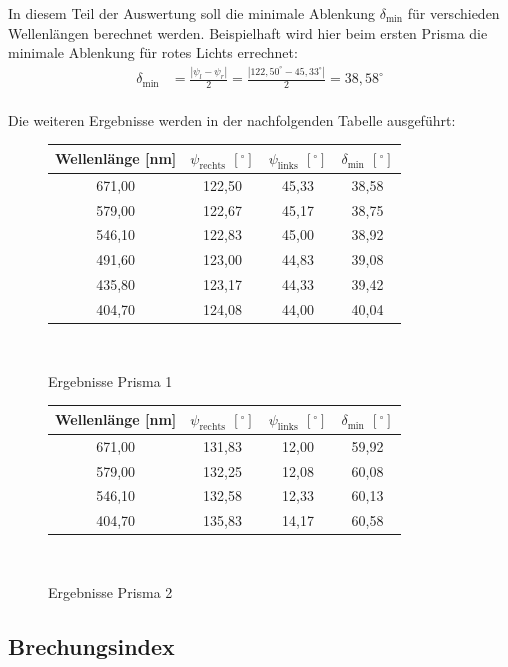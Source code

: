 \documentclass[fontsize=12pt]{scrartcl}
\renewcommand{\l}{\left\vert}
\renewcommand{\r}{\right\vert}
\begin{document}
In diesem Teil der Auswertung soll die minimale Ablenkung $\delta_{\text{min}}$ für verschieden Wellenlängen berechnet werden. Beispielhaft wird hier beim ersten Prisma die minimale Ablenkung für rotes Lichts errechnet:
\begin{align*}
\delta_{\text{min}} &=\frac{\l \psi_l - \psi_r  \r}{2} = \frac{\l 122,50^{\circ} - 45,33^{\circ}  \r}{2} = 38,58^{\circ}
\end{align*}\\
Die weiteren Ergebnisse werden in der nachfolgenden Tabelle ausgeführt:
\begin{figure}[h]
\centering
\caption{Ergebnisse Prisma 1}
\begin{tabular}{|c|c|c|c|} \hline
Wellenlänge [nm] & $\psi_{\text{rechts}}$ $[^{\circ}]$ & $\psi_{\text{links}}$ $[^{\circ}]$ & $\delta_{\text{min}}$ $[^{\circ}]$ \\ \hline
671,00	&122,50	&45,33	&38,58\\ \hline
579,00	&122,67	&45,17	&38,75\\ \hline
546,10	&122,83	&45,00	&38,92\\ \hline
491,60	&123,00	&44,83	&39,08\\ \hline
435,80	&123,17	&44,33	&39,42\\ \hline
404,70	&124,08	&44,00	&40,04\\ \hline
\end{tabular} \\
\end{figure}
\begin{figure}[h]
\centering
\caption{Ergebnisse Prisma 2}
\begin{tabular}{|c|c|c|c|} \hline
Wellenlänge [nm] & $\psi_{\text{rechts}}$ $[^{\circ}]$ & $\psi_{\text{links}}$ $[^{\circ}]$ & $\delta_{\text{min}}$ $[^{\circ}]$ \\ \hline
671,00	&131,83	&12,00	&59,92\\ \hline
579,00	&132,25	&12,08	&60,08\\ \hline
546,10	&132,58	&12,33	&60,13\\ \hline
404,70	&135,83	&14,17	&60,58\\ \hline
\end{tabular} \\
\end{figure}
\newpage
\subsection{Brechungsindex}
\end{document}
